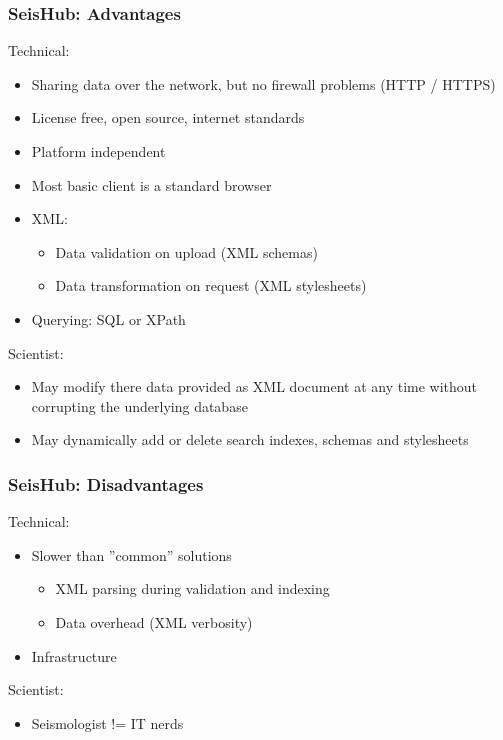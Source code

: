 \documentclass[t,10pt,compress=false,usepdftitle=false]{beamer}
\begin{document}
\begin{frame}[fragile]
    \frametitle{SeisHub: Advantages}
    Technical:
    \begin{itemize}
        \item Sharing data over the network, but no firewall problems (HTTP / HTTPS)
        \item License free, open source, internet standards
        \item Platform independent
        \item Most basic client is a standard browser
        \item XML:
        \begin{itemize}
            \item Data validation on upload (XML schemas)
            \item Data transformation on request (XML stylesheets)
        \end{itemize}
        \item Querying: SQL or XPath
    \end{itemize}
    Scientist:
    \begin{itemize}
        \item May modify there data provided as XML document at any time without corrupting the underlying database
        \item May dynamically add or delete search indexes, schemas and stylesheets
    \end{itemize}
\end{frame}

\begin{frame}[fragile]
    \frametitle{SeisHub: Disadvantages}
    Technical:
    \begin{itemize}
        \item Slower than ''common'' solutions
        \begin{itemize}
            \item XML parsing during validation and indexing
            \item Data overhead (XML verbosity)
        \end{itemize}
        \item Infrastructure
    \end{itemize}
    Scientist:
    \begin{itemize}
        \item Seismologist != IT nerds
    \end{itemize}
\end{frame}
\end{document}
